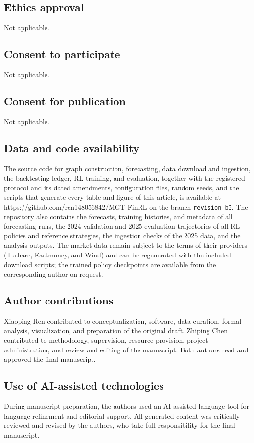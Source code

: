 \documentclass[pdflatex,sn-mathphys-num]{sn-jnl}%
\theoremstyle{thmstyleone}%
\theoremstyle{thmstyletwo}%
\theoremstyle{thmstylethree}%
\begin{document}
\subsection*{Ethics approval}
Not applicable.

\subsection*{Consent to participate}
Not applicable.

\subsection*{Consent for publication}
Not applicable.

\subsection*{Data and code availability}
{\color{blue}The source code for graph construction, forecasting, data download and ingestion, the backtesting ledger, RL training, and evaluation, together with the registered protocol and its dated amendments, configuration files, random seeds, and the scripts that generate every table and figure of this article, is available at \url{https://github.com/ren148056842/MGT-FinRL} on the branch \texttt{revision-b3}. The repository also contains the forecasts, training histories, and metadata of all forecasting runs, the 2024 validation and 2025 evaluation trajectories of all RL policies and reference strategies, the ingestion checks of the 2025 data, and the analysis outputs. The market data remain subject to the terms of their providers (Tushare, Eastmoney, and Wind) and can be regenerated with the included download scripts; the trained policy checkpoints are available from the corresponding author on request.\par}

\subsection*{Author contributions}
Xiaoping Ren contributed to conceptualization, software, data curation,
formal analysis, visualization, and preparation of the original draft.
Zhiping Chen contributed to methodology, supervision, resource
provision, project administration, and review and editing of the
manuscript. Both authors read and approved the final manuscript.

\subsection*{Use of AI-assisted technologies}
During manuscript preparation, the authors used an AI-assisted language
tool for language refinement and editorial support. All generated
content was critically reviewed and revised by the authors, who take
full responsibility for the final manuscript.
\FloatBarrier
\clearpage
\appendix
\end{document}
